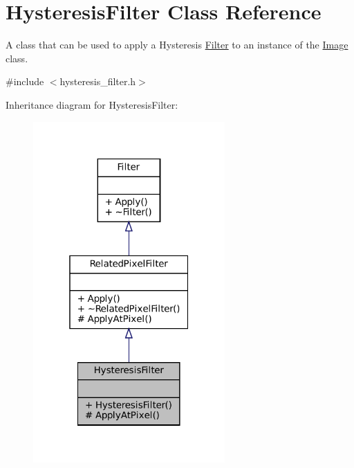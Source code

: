 \hypertarget{classHysteresisFilter}{}\section{Hysteresis\+Filter Class Reference}
\label{classHysteresisFilter}


A class that can be used to apply a Hysteresis \hyperlink{classFilter}{Filter} to an instance of the \hyperlink{classImage}{Image} class.  




{\ttfamily \#include $<$hysteresis\+\_\+filter.\+h$>$}



Inheritance diagram for Hysteresis\+Filter\+:\nopagebreak
\begin{figure}[H]
\begin{center}
\leavevmode
\includegraphics[width=208pt]{classHysteresisFilter__inherit__graph}
\end{center}
\end{figure}


